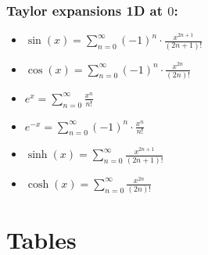\documentclass[a4paper,fontsize = 10pt]{article}
\def\sumn{\sum_{n=0}^\infty}
\begin{document}
\subsubsection*{Taylor expansions 1D at $0$:}
\begin{itemize}
 \item $\sin(x) = \sumn (-1)^n \cdot \frac{x^{2n+1}}{(2n+1)!}$
 \item $\cos(x) = \sumn (-1)^n \cdot \frac{x^{2n}}{(2n)!}$
 \item $e^x = \sumn \frac{x^n}{n!}$
 \item $e^{-x} = \sumn (-1)^n \cdot \frac{x^n}{n!}$
 \item $\sinh(x) = \sumn \frac{x^{2n+1}}{(2n+1)!}$
 \item $\cosh(x) = \sumn \frac{x^{2n}}{(2n)!}$
\end{itemize}


\section{Tables}
\end{document}
